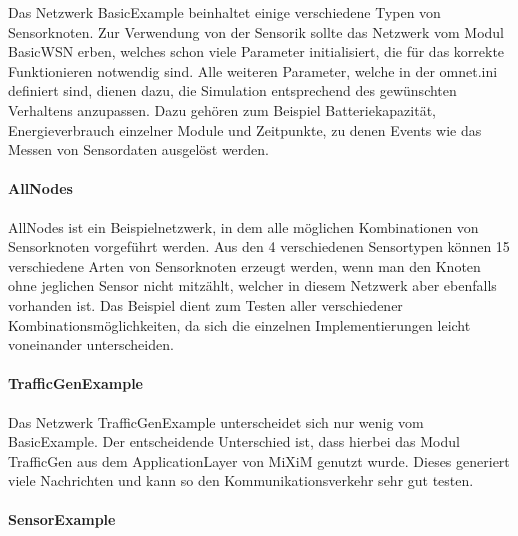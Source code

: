 Das Netzwerk BasicExample beinhaltet einige verschiedene Typen von Sensorknoten. Zur Verwendung von der Sensorik sollte das Netzwerk vom Modul BasicWSN erben, welches schon viele Parameter initialisiert, die für das korrekte Funktionieren notwendig sind. Alle weiteren Parameter, welche in der omnet.ini definiert sind, dienen dazu, die Simulation entsprechend des gewünschten Verhaltens anzupassen. Dazu gehören zum Beispiel Batteriekapazität, Energieverbrauch einzelner Module und Zeitpunkte, zu denen Events wie das Messen von Sensordaten ausgelöst werden.

\paragraph{AllNodes}

AllNodes ist ein Beispielnetzwerk, in dem alle möglichen Kombinationen von Sensorknoten vorgeführt werden. Aus den 4 verschiedenen Sensortypen können 15 verschiedene Arten von Sensorknoten erzeugt werden, wenn man den Knoten ohne jeglichen Sensor nicht mitzählt, welcher in diesem Netzwerk aber ebenfalls vorhanden ist. Das Beispiel dient zum Testen aller verschiedener Kombinationsmöglichkeiten, da sich die einzelnen Implementierungen leicht voneinander unterscheiden.

\paragraph{TrafficGenExample}

Das Netzwerk TrafficGenExample unterscheidet sich nur wenig vom BasicExample. Der entscheidende Unterschied ist, dass hierbei das Modul TrafficGen aus dem ApplicationLayer von MiXiM genutzt wurde. Dieses generiert viele Nachrichten und kann so den Kommunikationsverkehr sehr gut testen.

\paragraph{SensorExample}

